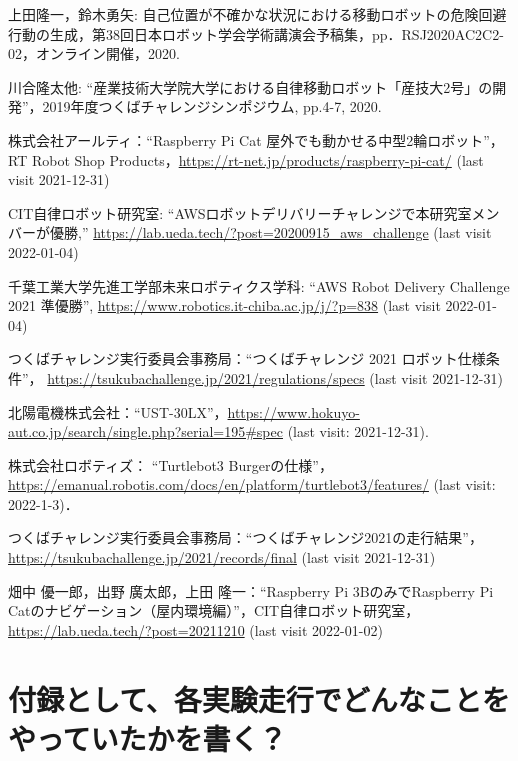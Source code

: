 \documentclass[twocolumn,9pt]{jsproceedings}
\begin{document}
\begin{thebibliography}{99}
 上田隆一，鈴木勇矢: 自己位置が不確かな状況における移動ロボットの危険回避行動の生成，第38回日本ロボット学会学術講演会予稿集，pp．RSJ2020AC2C2-02，オンライン開催，2020.

  川合隆太他: ``産業技術大学院大学における自律移動ロボット「産技大2号」の開発''，2019年度つくばチャレンジシンポジウム, pp.4-7, 2020.

  株式会社アールティ：``Raspberry Pi Cat 屋外でも動かせる中型2輪ロボット''，
  RT Robot Shop Products，\url{https://rt-net.jp/products/raspberry-pi-cat/} (last visit 2021-12-31)

	  CIT自律ロボット研究室: ``AWSロボットデリバリーチャレンジで本研究室メンバーが優勝,'' \url{https://lab.ueda.tech/?post=20200915_aws_challenge} (last visit 2022-01-04)

	  千葉工業大学先進工学部未来ロボティクス学科: ``AWS Robot Delivery Challenge 2021 準優勝'', \url{https://www.robotics.it-chiba.ac.jp/j/?p=838} (last visit 2022-01-04)
  
  つくばチャレンジ実行委員会事務局：``つくばチャレンジ 2021 ロボット仕様条件''，
  \url{https://tsukubachallenge.jp/2021/regulations/specs} (last visit 2021-12-31)
  
  北陽電機株式会社：``UST-30LX''，\url{https://www.hokuyo-aut.co.jp/search/single.php?serial=195#spec} (last visit: 2021-12-31).
  
  株式会社ロボティズ： ``Turtlebot3 Burgerの仕様''，\url{https://emanual.robotis.com/docs/en/platform/turtlebot3/features/} (last visit: 2022-1-3)．
  
  つくばチャレンジ実行委員会事務局：``つくばチャレンジ2021の走行結果''，
  \url{https://tsukubachallenge.jp/2021/records/final} (last visit 2021-12-31)

	  畑中 優一郎，出野 廣太郎，上田 隆一：``Raspberry Pi 3BのみでRaspberry Pi Catのナビゲーション（屋内環境編）''，CIT自律ロボット研究室，\url{https://lab.ueda.tech/?post=20211210} (last visit 2022-01-02)
\end{thebibliography}
\normalsize

\clearpage

\section{付録として、各実験走行でどんなことをやっていたかを書く？}
\end{document}
